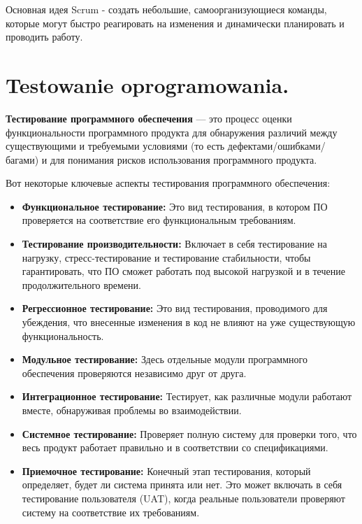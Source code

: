Основная идея Scrum - создать небольшие, самоорганизующиеся команды, которые могут быстро реагировать на изменения и динамически планировать и проводить работу.


\section{Testowanie oprogramowania.}

\textbf{Тестирование программного обеспечения} — это процесс оценки функциональности программного продукта для обнаружения различий между существующими и требуемыми условиями (то есть дефектами/ошибками/багами) и для понимания рисков использования программного продукта.

Вот некоторые ключевые аспекты тестирования программного обеспечения:

\begin{itemize}
\item \textbf{Функциональное тестирование:} Это вид тестирования, в котором ПО проверяется на соответствие его функциональным требованиям.

\item \textbf{Тестирование производительности:} Включает в себя тестирование на нагрузку, стресс-тестирование и тестирование стабильности, чтобы гарантировать, что ПО сможет работать под высокой нагрузкой и в течение продолжительного времени.

\item \textbf{Регрессионное тестирование:} Это вид тестирования, проводимого для убеждения, что внесенные изменения в код не влияют на уже существующую функциональность.

\item \textbf{Модульное тестирование:} Здесь отдельные модули программного обеспечения проверяются независимо друг от друга.

\item \textbf{Интеграционное тестирование:} Тестирует, как различные модули работают вместе, обнаруживая проблемы во взаимодействии.

\item \textbf{Системное тестирование:} Проверяет полную систему для проверки того, что весь продукт работает правильно и в соответствии со спецификациями.

\item \textbf{Приемочное тестирование:} Конечный этап тестирования, который определяет, будет ли система принята или нет. Это может включать в себя тестирование пользователя (UAT), когда реальные пользователи проверяют систему на соответствие их требованиям.
\end{itemize}

